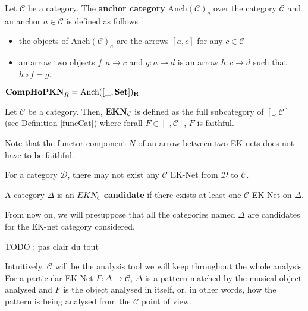 \documentclass{report}
\begin{document}
\begin{defn}
    Let $\mathcal{C}$ be a category. The \textbf{anchor category} $\text{Anch}(\mathcal{C})_a$ over the category $\mathcal{C}$  and an anchor $a \in \mathcal{C}$ is defined as follows :
    \begin{itemize}
        \item the objects of  $\text{Anch}(\mathcal{C})_a$ are the arrows $[a,c]$ for any $c\in \mathcal{C}$
        \item an arrow two objects $f : a \rightarrow c$ and $g : a \rightarrow d$ is an arrow $h : c\rightarrow d$ such that $h \circ f = g$.
    \end{itemize}
\end{defn}
\begin{rem}
    $\textbf{CompHoPKN}_R  = \text{Anch}([\_,\bf Set])_R$
\end{rem}

\begin{defn}
    Let $\mathcal{C}$ be a category. Then, $\bf EKN_\mathcal{C}$ is defined as the full subcategory of $[\_,\mathcal{C}]$ (see Definition \ref{funcCat}) where forall $F\in [\_,\mathcal{C}]$, $F$ is faithful.
\end{defn}

\begin{rem}
    Note that the functor component $N$ of an arrow between two EK-nets does not have to be faithful.
\end{rem}

For a category $\mathcal{D}$, there may not exist any $\mathcal{C}$ EK-Net from $\mathcal{D}$ to $\mathcal{C}$.
\begin{defn}
    A category $\Delta$ is an $EKN_{\mathcal{C}}$ \textbf{candidate} if there exists at least one $\mathcal{C}$ EK-Net on $\Delta$.
\end{defn}

\begin{note}
    From now on, we will presuppose that all the categories named $\Delta$ are candidates for the EK-net category considered.
\end{note}



TODO : pas clair du tout

Intuitively, $\mathcal{C}$ will be the analysis tool we will keep throughout the whole analysis. For a particular EK-Net $F : \Delta \rightarrow \mathcal{C}$, $\Delta$ is a pattern matched by the musical object analysed and $F$ is the object analysed in itself, or, in other words, how the pattern is being analysed from the $\mathcal{C}$ point of view.
\end{document}
